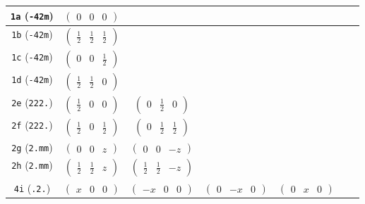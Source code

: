 \documentclass[fleqn,9pt,landscape]{jsarticle}
\begin{document}
\begin{center}
\begin{longtable}{ccccccc}
{\tt 1a} ({\tt -42m}) & $ \begin{pmatrix} 0 & 0 & 0 \end{pmatrix} $ & $  $ & $  $ & $  $ & $  $ & $  $ \\ \hline
{\tt 1b} ({\tt -42m}) & $ \begin{pmatrix} \frac{1}{2} & \frac{1}{2} & \frac{1}{2} \end{pmatrix} $ & $  $ & $  $ & $  $ & $  $ & $  $ \\ \hline
{\tt 1c} ({\tt -42m}) & $ \begin{pmatrix} 0 & 0 & \frac{1}{2} \end{pmatrix} $ & $  $ & $  $ & $  $ & $  $ & $  $ \\ \hline
{\tt 1d} ({\tt -42m}) & $ \begin{pmatrix} \frac{1}{2} & \frac{1}{2} & 0 \end{pmatrix} $ & $  $ & $  $ & $  $ & $  $ & $  $ \\ \hline
{\tt 2e} ({\tt 222.}) & $ \begin{pmatrix} \frac{1}{2} & 0 & 0 \end{pmatrix} $ & $ \begin{pmatrix} 0 & \frac{1}{2} & 0 \end{pmatrix} $ & $  $ & $  $ & $  $ & $  $ \\ \hline
{\tt 2f} ({\tt 222.}) & $ \begin{pmatrix} \frac{1}{2} & 0 & \frac{1}{2} \end{pmatrix} $ & $ \begin{pmatrix} 0 & \frac{1}{2} & \frac{1}{2} \end{pmatrix} $ & $  $ & $  $ & $  $ & $  $ \\ \hline
{\tt 2g} ({\tt 2.mm}) & $ \begin{pmatrix} 0 & 0 & z \end{pmatrix} $ & $ \begin{pmatrix} 0 & 0 & - z \end{pmatrix} $ & $  $ & $  $ & $  $ & $  $ \\ \hline
{\tt 2h} ({\tt 2.mm}) & $ \begin{pmatrix} \frac{1}{2} & \frac{1}{2} & z \end{pmatrix} $ & $ \begin{pmatrix} \frac{1}{2} & \frac{1}{2} & - z \end{pmatrix} $ & $  $ & $  $ & $  $ & $  $ \\ \hline
{\tt 4i} ({\tt .2.}) & $ \begin{pmatrix} x & 0 & 0 \end{pmatrix} $ & $ \begin{pmatrix} - x & 0 & 0 \end{pmatrix} $ & $ \begin{pmatrix} 0 & - x & 0 \end{pmatrix} $ & $ \begin{pmatrix} 0 & x & 0 \end{pmatrix} $ & $  $ & $  $ \\ \hline

\end{longtable}
\end{center}
\end{document}
